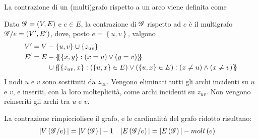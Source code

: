 La contrazione di un (multi)grafo rispetto a un arco viene definita come
\begin{definition}
    [Contrazione]
    \label{def:contrazione}
    Dato $
    \mathscr{G}{} = \left( V, E \right)
    $ e $
    e \in E
    $, la contrazione di $
    \mathscr{G}{}
    $ rispetto ad $e$ è il multigrafo $
    \mathscr{G}{} / e = \left( V', E' \right)
    $, dove, posto $
    e =
    \left\{ u, v \right\}
    $, valgono
    \begin{align*}
        V'
        &
        = 
        V
        -
        \left\{ u, v \right\}
        \cup
        \left\{
            z_{uv}
        \right\}
        \\
        E'
        &
        = 
        E 
        \begin{aligned}[t]
            &
            -
            \{\mskip-5mu\{
                \left\{ x, y \right\}
                :
                \left( x = u \right)
                \vee
                \left( y = v \right)
            \}\mskip-5mu\}
            \\
            &
            \mskip1mu
            \cup
            \{\mskip-5mu\{
                \left\{ z_{uv}, x \right\}
                :
                \left( \left\{ u,x \right\} \in E \right)
                \vee
                \left( \left\{ u,x \right\} \in E \right)
                :
                \left( x \ne u \right)
                \wedge
                \left( x \ne v \right)
            \}\mskip-5mu\}
        \end{aligned}
    \end{align*}
    I nodi $u$ e $v$ sono sostituiti da $
    z_{uv}
    $.
    Vengono eliminati tutti gli archi incidenti su $u$ e $v$, e inseriti, con la loro molteplicità, come archi incidenti su $
    z_{uv}
    $.
    Non vengono reinseriti gli archi tra $u$ e $v$.
\end{definition}
    La contrazione rimpicciolisce il grafo, e le cardinalità del grafo ridotto risultano:
    \begin{align*}
        |V \left( \mathscr{G}{} / e \right)| 
        &= 
        |V \left( \mathscr{G}{} \right)| 
        -1
        &
        |E \left( \mathscr{G}{} / e \right)| 
        &= 
        |E \left( \mathscr{G}{} \right)| 
        - molt\left( e \right)
    \end{align*}

